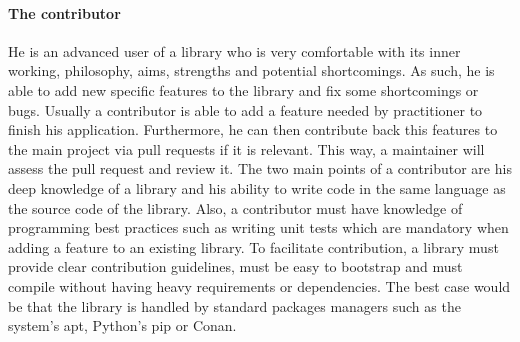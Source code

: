 \paragraph{The contributor} He is an advanced user of a library who is very comfortable with its inner working,
philosophy, aims, strengths and potential shortcomings. As such, he is able to add new specific features to the library
and fix some shortcomings or bugs. Usually a contributor is able to add a feature needed by practitioner to finish his
application. Furthermore, he can then contribute back this features to the main project via pull requests if it is
relevant. This way, a maintainer will assess the pull request and review it. The two main points of a contributor are
his deep knowledge of a library and his ability to write code in the same language as the source code of the library.
Also, a contributor must have knowledge of programming best practices such as writing unit tests which are mandatory
when adding a feature to an existing library. To facilitate contribution, a library must provide clear contribution
guidelines, must be easy to bootstrap and must compile without having heavy requirements or dependencies. The best case
would be that the library is handled by standard packages managers such as the system's apt, Python's pip or Conan.

